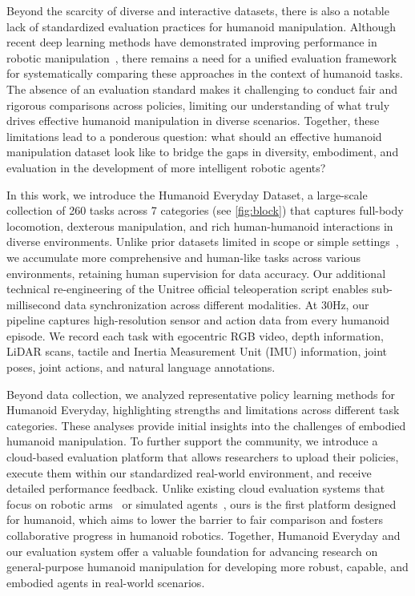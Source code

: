 \documentclass[letterpaper, 10pt, conference]{ieeeconf}
\begin{document}
Beyond the scarcity of diverse and interactive datasets, there is also a notable lack of standardized evaluation practices for humanoid manipulation. Although recent deep learning methods have demonstrated improving performance in robotic manipulation~\cite{chi2023diffusion, ze20243d, zhao2023learning, kim2024openvla}, there remains a need for a unified evaluation framework for systematically comparing these approaches in the context of humanoid tasks. The absence of an evaluation standard makes it challenging to conduct fair and rigorous comparisons across policies, limiting our understanding of what truly drives effective humanoid manipulation in diverse scenarios. Together, these limitations lead to a ponderous question: what should an effective humanoid manipulation dataset look like to bridge the gaps in diversity, embodiment, and evaluation in the development of more intelligent robotic agents?\par

In this work, we introduce the Humanoid Everyday Dataset, a large-scale collection of 260 tasks across 7 categories (see \autoref{fig:block}) that captures full-body locomotion, dexterous manipulation, and rich human-humanoid interactions in diverse environments. Unlike prior datasets limited in scope or simple settings~\cite{qiu2025-humanpolicy, fourier2025actionnet, bu2025agibot}, we accumulate more comprehensive and human-like tasks across various environments, retaining human supervision for data accuracy. Our additional technical re-engineering of the Unitree official teleoperation script enables sub-millisecond data synchronization across different modalities. At 30Hz, our pipeline captures high-resolution sensor and action data from every humanoid episode. We record each task with egocentric RGB video, depth information, LiDAR scans, tactile and Inertia Measurement Unit (IMU) information, joint poses, joint actions, and natural language annotations.\par 

Beyond data collection, we analyzed representative policy learning methods for Humanoid Everyday, highlighting strengths and limitations across different task categories. These analyses provide initial insights into the challenges of embodied humanoid manipulation. To further support the community, we introduce a cloud-based evaluation platform that allows researchers to upload their policies, execute them within our standardized real-world environment, and receive detailed performance feedback. Unlike existing cloud evaluation systems that focus on robotic arms~\cite{zhou2025autoeval} or simulated agents~\cite{li2024evaluating}, ours is the first platform designed for humanoid, which aims to lower the barrier to fair comparison and fosters collaborative progress in humanoid robotics. Together, Humanoid Everyday and our evaluation system offer a valuable foundation for advancing research on general-purpose humanoid manipulation for developing more robust, capable, and embodied agents in real-world scenarios.\par
\end{document}
